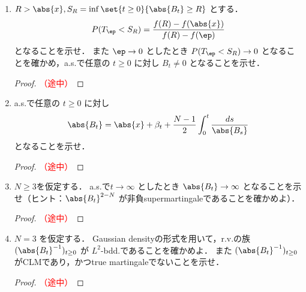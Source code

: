 \documentclass{jsarticle}
\begin{document}
\begin{enumerate}
\begin{proof}
    \end{proof}
    
    \item
    $R>\abs{x},S_R=\inf\set{t\ge0}{\abs{B_t}\ge R}$ とする．
    $$
    P(T_\ep<S_R)=\frac{f(R)-f(\abs{x})}{f(R)-f(\ep)}
    $$
    となることを示せ．
    また $\ep\to0$ としたとき $P(T_\ep<S_R)\to0$ となることを確かめ，a.s.で任意の $t\ge0$ に対し $B_t\neq0$ となることを示せ．
    \begin{proof}\textcolor{red}{（途中）}
        
    \end{proof}
    
    \item
    a.s.で任意の $t\ge0$ に対し
    $$
    \abs{B_t}
    = \abs{x}+\beta_t+\frac{N-1}{2}\int_0^t \frac{ds}{\abs{B_s}}
    $$
    となることを示せ．
    \begin{proof}\textcolor{red}{（途中）}
        
    \end{proof}
    
    \item
    $N\ge3$を仮定する．
    a.s.で$t\to\infty$ としたとき $\abs{B_t}\to\infty$ となることを示せ（ヒント：$\abs{B_t}^{2-N}$ が非負supermartingaleであることを確かめよ）．
    \begin{proof}\textcolor{red}{（途中）}
        
    \end{proof}
    
    \item
    $N=3$ を仮定する．
    Gaussian densityの形式を用いて，r.v.の族 $(\abs{B_t}^{-1})_{t\ge0}$ が $L^2$-bdd.であることを確かめよ．
    また $(\abs{B_t}^{-1})_{t\ge0}$ がCLMであり，かつtrue martingaleでないことを示せ．
    \begin{proof}\textcolor{red}{（途中）}
        
    \end{proof}
\end{enumerate}
\end{document}
